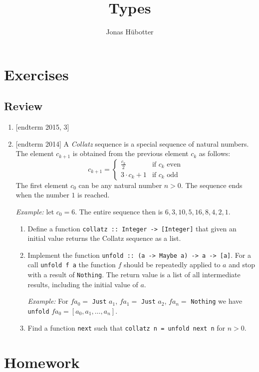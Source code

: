 \documentclass{article}
\title{Types}
\author{Jonas Hübotter}
\begin{document}
\maketitle

\section{Exercises}

\subsection{Review}
\begin{enumerate}
\item {[endterm 2015, 3]}
\item {[endterm 2014]} A \textit{Collatz} sequence is a special sequence of natural numbers. The element $c_{k+1}$ is obtained from the previous element $c_k$ as follows:
\[
c_{k+1} =
\begin{cases}
  \frac{c_k}{2} & \text{if $c_k$ even} \\
  3 \cdot c_k + 1 & \text{if $c_k$ odd}
\end{cases}
\]
The first element $c_0$ can be any natural number $n > 0$. The sequence ends when the number $1$ is reached. \par
\textit{Example:} let $c_0 = 6$. The entire sequence then is $6,3,10,5,16,8,4,2,1$.
\begin{enumerate}
\item Define a function \verb|collatz :: Integer -> [Integer]| that given an initial value returns the Collatz sequence as a list.
\item Implement the function \verb|unfold :: (a -> Maybe a) -> a -> [a]|. For a call \verb|unfold f a| the function $f$ should be repeatedly applied to $a$ and stop with a result of \verb|Nothing|. The return value is a list of all intermediate results, including the initial value of $a$. \par
\textit{Example:} For $f a_0 =$ \verb|Just| $a_1$, $f a_1 =$ \verb|Just| $a_2$, $f a_n =$ \verb|Nothing| we have \verb|unfold| $f a_0 = [a_0, a_1, \dots, a_n]$.
\item Find a function \verb|next| such that \verb|collatz n = unfold next n| for $n > 0$.
\end{enumerate}
\end{enumerate}

\section{Homework}

\printbibliography
\end{document}
